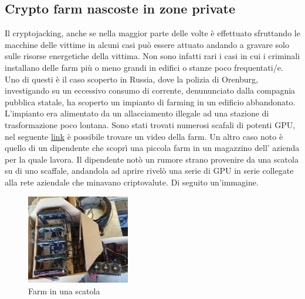 \documentclass[12pt,a4paper]{article}
\begin{document}
\subsection{Crypto farm nascoste in zone private}
Il cryptojacking, anche se nella maggior parte delle volte è effettuato
sfruttando le macchine delle vittime in alcuni casi può essere attuato andando
a gravare solo sulle risorse energetiche della vittima. Non sono infatti rari i
casi in cui i criminali installano delle farm più o meno grandi in edifici o
stanze poco frequentati/e. Uno di questi è il caso scoperto in Russia,
dove la polizia di Orenburg, investigando su un eccessivo consumo di corrente,
denununciato dalla compagnia pubblica statale, ha scoperto un impianto di
farming in un edificio abbandonato. L'impianto era alimentato da un
allacciamento illegale ad una stazione di trasformazione poco lontana. Sono
stati trovati numerosi scafali di potenti GPU, nel seguente
\href{https://youtu.be/aLTTRZJIvY4}{link} è possibile trovare un video della
farm. Un altro caso noto è quello di un dipendente che scoprì una piccola farm
in un magazzino dell' azienda per la quale lavora. Il dipendente notò un rumore
strano provenire da una scatola su di uno scaffale, andandola ad aprire rivelò una
serie di GPU in serie collegate alla rete aziendale che minavano criptovalute.
Di seguito un'immagine. 

\begin{figure}[h]
    \centering
    \includegraphics[width=0.40\textwidth]{./images/mini_farm.png}
    \caption{Farm in una scatola}
    \label{fig:mkini_farm}
\end{figure}
\end{document}
